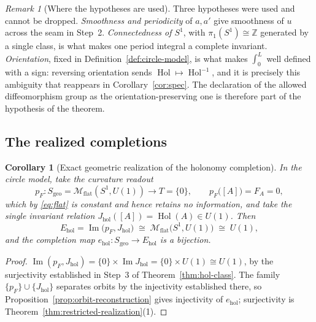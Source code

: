 \documentclass[11pt,a4paper]{article}
\theoremstyle{plain}
\newtheorem{corollary}[theorem]{Corollary}
\theoremstyle{definition}
\theoremstyle{remark}
\newtheorem{remark}[theorem]{Remark}
\newcommand{\Int}{\mathbb{Z}}
\newcommand{\Sgeo}{S_{\mathrm{geo}}}
\newcommand{\Hol}{\operatorname{Hol}}
\newcommand{\Imm}{\operatorname{Im}}
\newcommand{\Mflat}{\mathcal{M}_{\mathrm{flat}}}
\begin{document}
\begin{remark}[Where the hypotheses are used]
\label{rem:u1-hyps}
Three hypotheses were used and cannot be dropped. \emph{Smoothness and periodicity} of $a,a'$ give
smoothness of $u$ across the seam in Step~2. \emph{Connectedness of $S^1$}, with
$\pi_1(S^1)\cong\Int$ generated by a single class, is what makes one period integral a complete
invariant. \emph{Orientation}, fixed in Definition~\ref{def:circle-model}, is what makes $\int_0^L$
well defined with a sign: reversing orientation sends $\Hol\mapsto\Hol^{-1}$, and it is precisely
this ambiguity that reappears in Corollary~\ref{cor:spec}. The declaration of the allowed
diffeomorphism group as the orientation-preserving one is therefore part of the hypothesis of the
theorem.
\end{remark}

\subsection{The realized completions}

\begin{corollary}[Exact geometric realization of the holonomy completion]
\label{cor:hol-completion}
In the circle model, take the curvature readout
\begin{equation}
\label{eq:pF}
p_F\colon \Sgeo=\Mflat(S^1,U(1))\longrightarrow T=\{0\},
\qquad
p_F\bigl([A]\bigr)=F_A=0 ,
\end{equation}
which by \eqref{eq:flat} is constant and hence retains \emph{no} information, and take the single
invariant relation $J_{\mathrm{hol}}([A])=\Hol(A)\in U(1)$. Then
\begin{equation}
\label{eq:Ehol}
E_{\mathrm{hol}}
=\Imm\bigl(p_F,J_{\mathrm{hol}}\bigr)
\;\cong\;
\Mflat\bigl(S^1,U(1)\bigr)
\;\cong\; U(1),
\end{equation}
and the completion map $e_{\mathrm{hol}}\colon\Sgeo\to E_{\mathrm{hol}}$ is a \emph{bijection}.
\end{corollary}

\begin{proof}
$\Imm(p_F,J_{\mathrm{hol}})=\{0\}\times\Imm J_{\mathrm{hol}}=\{0\}\times U(1)\cong U(1)$, by the
surjectivity established in Step~3 of Theorem~\ref{thm:hol-class}. The family
$\{p_F\}\cup\{J_{\mathrm{hol}}\}$ separates orbits by the injectivity established there, so
Proposition~\ref{prop:orbit-reconstruction} gives injectivity of $e_{\mathrm{hol}}$; surjectivity is
Theorem~\ref{thm:restricted-realization}(1).
\end{proof}
\end{document}
